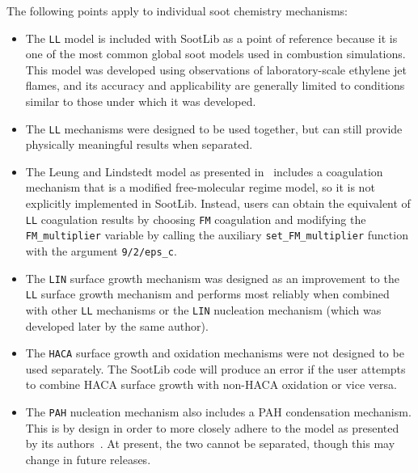 \documentclass[preprint,letterpaper]{elsarticle}
\begin{document}
The following points apply to individual soot chemistry mechanisms:
\begin{itemize}
    \item The \texttt{LL} model is included with SootLib as a point of reference because it is one of the most common global soot models used in combustion simulations. This model was developed using observations of laboratory-scale ethylene jet flames, and its accuracy and applicability are generally limited to conditions similar to those under which it was developed.
    \item The \texttt{LL} mechanisms were designed to be used together, but can still provide physically meaningful results when separated.
    \item The Leung and Lindstedt model as presented in~\cite{Leung_1991} includes a coagulation mechanism that is a modified free-molecular regime model, so it is not explicitly implemented in SootLib. Instead, users can obtain the equivalent of \texttt{LL} coagulation results by choosing \texttt{FM} coagulation and modifying the \texttt{FM\_multiplier} variable by calling the auxiliary \texttt{set\_FM\_multiplier} function with the argument \texttt{9/2/eps\_c}.
    \item The \texttt{LIN} surface growth mechanism was designed as an improvement to the \texttt{LL} surface growth mechanism and performs most reliably when combined with other \texttt{LL} mechanisms or the \texttt{LIN} nucleation mechanism (which was developed later by the same author).
    \item The \texttt{HACA} surface growth and oxidation mechanisms were not designed to be used separately. The SootLib code will produce an error if the user attempts to combine HACA surface growth with non-HACA oxidation or vice versa.
    \item The \texttt{PAH} nucleation mechanism also includes a PAH condensation mechanism. This is by design in order to more closely adhere to the model as presented by its authors~\cite{Blanquart_2009c}. At present, the two cannot be separated, though this may change in future releases.
\end{itemize}
\end{document}
